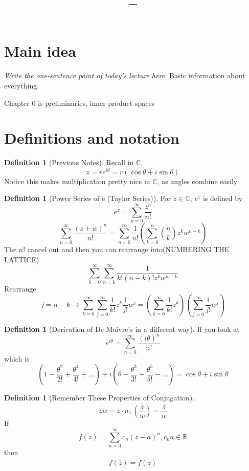 \documentclass[11pt]{article}
\title{\vspace{-1.5em}\textbf{\coursename -- \lecturetitle}}
\author{\studentname}
\date{\lecturedate}
\newcommand{\1}{\mathbf{1}}
\theoremstyle{notestyle}
\theoremstyle{definition}
\newtheorem{definition}[theorem]{Definition}
\begin{document}
\maketitle

\section{Main idea}
\textit{Write the one-sentence point of today's lecture here.}
Basic information about everything.
\par Chapter 0 is preliminaries, inner product spaces
\section{Definitions and notation}
\begin{definition}[Previous Notes]
    Recall in $\mathbb{C}$, $$z = r e^{i \theta} = r \left(\cos\theta + i \sin \theta\right)$$
    Notice this makes multiplication pretty nice in $\mathbb{C}$, as angles combine
    easily

\end{definition}
\begin{definition}[Power Series of e (Taylor Series)]
\label{def:label}
For $z \in \mathbb{C}$, $e^z$ is defined by $$e^z = \sum_{n = 0}^{\infty}
\frac{z^n}{n!}$$ 
$$\sum_{n=0}^{\infty} \frac{(z+w)^n}{n!} = \sum_{n=0}^{\infty}\frac{1}{n!}\left(\sum_{k=0}^{n}\binom{n}{k}z^kw^{n-k}\right)$$
The $n!$ cancel out and then you can rearrange into(NUMBERING THE LATTICE)
$$\sum_{k=0}^{\infty}\sum_{n=k}^{\infty} \frac{1}{k!(n-k)! z^kw^{n-k}}$$
Rearrange $$j = n-k \rightarrow \sum_{k=0}^{\infty}\sum_{j=0}^{\infty}\frac{1}{k!}z^k
\frac{1}{j!}{w^{j}} = \left(\sum_{k=0}^{\infty}\frac{1}{k!}z^k\right)\left(\sum_{j=0}^{\infty}\frac{1}{j!}w^{j}\right)$$
\end{definition}
\begin{definition}[Derivation of De Moivre's in a different way]
\label{def:label}
If you look at $$e^{i\theta}=\sum_{n=0}^{\infty} \frac{(i \theta)^n}{n!} $$
which is 
$$\left(1 - \frac{\theta^2}{2!} + \frac{\theta^{4}}{4!} + ...\right) + i \left(\theta -
\frac{\theta^3}{3!}+\frac{\theta^5}{5!} - ...\right) = \cos \theta + i \sin \theta$$
\end{definition}
\begin{definition}[Remember These Properties of Conjugation]
\label{def:label}
$$\overline{zw} = \overline{z}\cdot \overline{w}, \overline{\left(\frac{z}{w}\right)} =
\frac{\overline{z}}{\overline{w}}$$
If $$f(z) = \sum_{n=0}^{\infty} c_n (z-a)^n, c_n a \in \mathbb{R} $$
then $$f(\overline{z}) = \overline{f(z)}$$
\end{definition}
\end{document}
